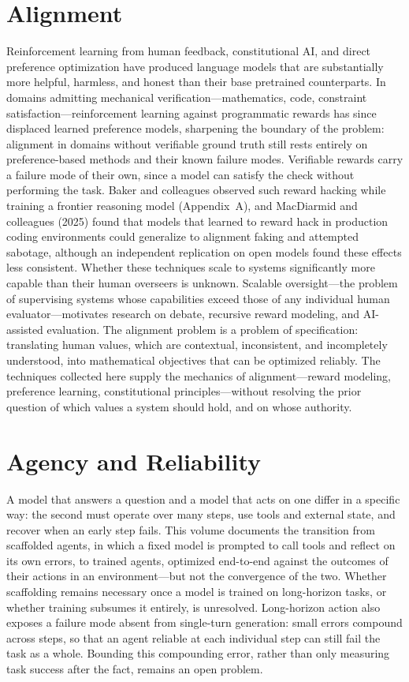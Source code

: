 \section*{Alignment}

Reinforcement learning from human feedback, constitutional AI, and direct preference optimization have produced language models that are substantially more helpful, harmless, and honest than their base pretrained counterparts. In domains admitting mechanical verification---mathematics, code, constraint satisfaction---reinforcement learning against programmatic rewards has since displaced learned preference models, sharpening the boundary of the problem: alignment in domains without verifiable ground truth still rests entirely on preference-based methods and their known failure modes. Verifiable rewards carry a failure mode of their own, since a model can satisfy the check without performing the task. Baker and colleagues observed such reward hacking while training a frontier reasoning model (Appendix~A), and MacDiarmid and colleagues (2025) found that models that learned to reward hack in production coding environments could generalize to alignment faking and attempted sabotage, although an independent replication on open models found these effects less consistent. Whether these techniques scale to systems significantly more capable than their human overseers is unknown. Scalable oversight---the problem of supervising systems whose capabilities exceed those of any individual human evaluator---motivates research on debate, recursive reward modeling, and AI-assisted evaluation. The alignment problem is a problem of specification: translating human values, which are contextual, inconsistent, and incompletely understood, into mathematical objectives that can be optimized reliably. The techniques collected here supply the mechanics of alignment---reward modeling, preference learning, constitutional principles---without resolving the prior question of which values a system should hold, and on whose authority.

\section*{Agency and Reliability}

A model that answers a question and a model that acts on one differ in a specific way: the second must operate over many steps, use tools and external state, and recover when an early step fails. This volume documents the transition from scaffolded agents, in which a fixed model is prompted to call tools and reflect on its own errors, to trained agents, optimized end-to-end against the outcomes of their actions in an environment---but not the convergence of the two. Whether scaffolding remains necessary once a model is trained on long-horizon tasks, or whether training subsumes it entirely, is unresolved. Long-horizon action also exposes a failure mode absent from single-turn generation: small errors compound across steps, so that an agent reliable at each individual step can still fail the task as a whole. Bounding this compounding error, rather than only measuring task success after the fact, remains an open problem.

